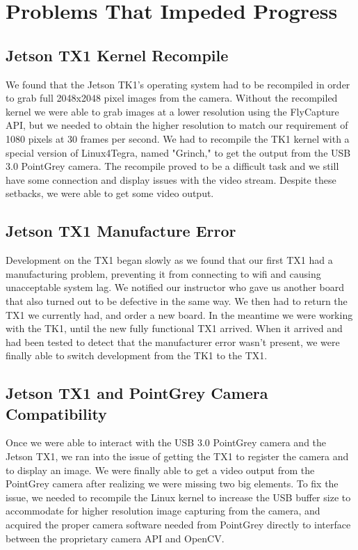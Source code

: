 \documentclass[letterpaper,10pt,titlepage]{IEEEtran}
\begin{document}
   \section{Problems That Impeded Progress}
   \subsection{Jetson TX1 Kernel Recompile}
   We found that the Jetson TK1's operating system had to be recompiled in order to grab full 2048x2048 pixel images from the camera. Without the recompiled kernel we were able to grab images at a lower resolution using the FlyCapture API, but we needed to obtain the higher resolution to match our requirement of 1080 pixels at 30 frames per second. We had to recompile the TK1 kernel with a special version of Linux4Tegra, named "Grinch," to get the output from the USB 3.0 PointGrey camera. The recompile proved to be a difficult task and we still have some connection and display issues with the video stream. Despite these setbacks, we were able to get some video output.	
   
   \subsection{Jetson TX1 Manufacture Error}
   Development on the TX1 began slowly as we found that our first TX1 had a manufacturing problem, preventing it from connecting to wifi and causing unacceptable system lag. We notified our instructor who gave us another board that also turned out to be defective in the same way. We then had to return the TX1 we currently had, and order a new board. In the meantime we were working with the TK1, until the new fully functional TX1 arrived. When it arrived and had been tested to detect that the manufacturer error wasn't present, we were finally able to switch development from the TK1 to the TX1.
   
   \subsection{Jetson TX1 and PointGrey Camera Compatibility}
   Once we were able to interact with the USB 3.0 PointGrey camera and the Jetson TX1, we ran into the issue of getting the TX1 to register the camera and to display an image. We were finally able to get a video output from the PointGrey camera after realizing we were missing two big elements. To fix the issue, we needed to recompile the Linux kernel to increase the USB buffer size to accommodate for higher resolution image capturing from the camera, and acquired the proper camera software needed from PointGrey directly to interface between the proprietary camera API and OpenCV.
   
\end{document}
